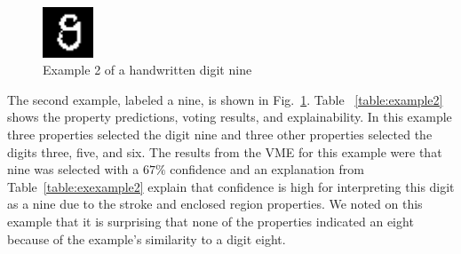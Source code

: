 \documentclass[conference]{IEEEtran}
\begin{document}
 \begin{figure}[htbp]
\centerline{\includegraphics[width=15mm]{./digit-images/9-9.png}}
\caption{Example 2 of a handwritten digit nine}
\label{example2}
\end{figure}


The second example,  labeled a nine, is shown in Fig.~\ref{example2}.  Table ~\ref{table:example2} shows the property predictions, voting results, and explainability.  In this example three properties selected the digit nine and three other properties selected the digits three, five, and six.  The results from the VME for this example were that nine was selected with a $67\%$ confidence and an explanation from Table~\ref{table:exexample2} explain that confidence is high for interpreting this digit as a nine due to the stroke and enclosed region properties.  We noted on this example that it is surprising that none of the properties indicated an eight because of the example's similarity to a digit eight.  
\end{document}
